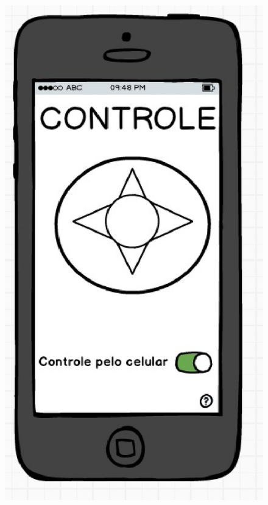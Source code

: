 \begin{figure}[!htb]
{  		\includegraphics[keepaspectratio=true,scale=0.6]{figuras/controle/tela_3}
		}
		\quad %
		\subfloat{
}
\end{figure}
